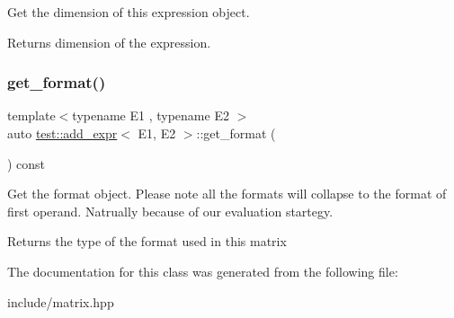 Get the dimension of this expression object. 

\begin{DoxyReturn}{Returns}
dimension of the expression. 
\end{DoxyReturn}
\mbox{\label{classtest_1_1add__expr_a98c4415c877e86fb75a46017414e1ef7}} 
\subsubsection{\texorpdfstring{get\_format()}{get\_format()}}
{\footnotesize\ttfamily template$<$typename E1 , typename E2 $>$ \\
auto \mbox{\hyperlink{classtest_1_1add__expr}{test\+::add\+\_\+expr}}$<$ E1, E2 $>$\+::get\+\_\+format (\begin{DoxyParamCaption}{ }\end{DoxyParamCaption}) const\hspace{0.3cm}{\ttfamily [inline]}}



Get the format object. Please note all the formats will collapse to the format of first operand. Natrually because of our evaluation startegy. 

\begin{DoxyReturn}{Returns}
the type of the format used in this matrix 
\end{DoxyReturn}


The documentation for this class was generated from the following file\+:\begin{DoxyCompactItemize}
\item 
include/matrix.\+hpp\end{DoxyCompactItemize}

